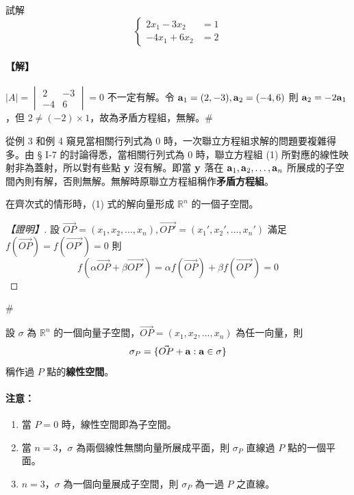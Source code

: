 \begin{example}\label{ex:b6-1-44}
試解
\[ \left\{\begin{aligned}
2x_1 - 3x_2 &= 1 \\
-4x_1 + 6x_2 &= 2
\end{aligned}\right. \]
\end{example}

\paragraph{【解】}
$|A| = \begin{vmatrix} 2 & -3 \\ -4 & 6 \end{vmatrix} = 0$ 不一定有解。令 $\boldsymbol{\mathbf{a}}_1=(2, -3), \boldsymbol{\mathbf{a}}_2=(-4, 6)$ 則 $\boldsymbol{\mathbf{a}}_2 = -2\boldsymbol{\mathbf{a}}_1$，但 $2 \ne (-2) \times 1$，故為矛盾方程組，無解。\hfill$\#$

從例 3 和例 4 窺見當相關行列式為 0 時，一次聯立方程組求解的問題要複雜得多。由 § I-7 的討論得悉，當相關行列式為 0 時，聯立方程組 (1) 所對應的線性映射非為蓋射，所以對有些點 $\boldsymbol{\mathbf{y}}$ 沒有解。即當 $\boldsymbol{\mathbf{y}}$ 落在 $\boldsymbol{\mathbf{a}}_1, \boldsymbol{\mathbf{a}}_2, \dots, \boldsymbol{\mathbf{a}}_n$ 所展成的子空間內則有解，否則無解。無解時原聯立方程組稱作\textbf{矛盾方程組}。

\begin{discussion}[*]\label{disc:b6-1-6}
在齊次式的情形時，(1) 式的解向量形成 $\mathbb{R}^n$ 的一個子空間。
\end{discussion}

\begin{proof}[【證明】]
設 $\vec{OP}=(x_1, x_2, \dots, x_n), \vec{OP'}=(x_1', x_2', \dots, x_n')$ 滿足 $f(\vec{OP}) = f(\vec{OP'}) = 0$ 則
\[ f(\alpha\vec{OP} + \beta\vec{OP'}) = \alpha f(\vec{OP}) + \beta f(\vec{OP'}) = 0 \]
\end{proof}\hfill$\#$

\begin{definition*}[**]\label{def:b6-1-affine}
設 $\sigma$ 為 $\mathbb{R}^n$ 的一個向量子空間，$\vec{OP}=(x_1, x_2, \dots, x_n)$ 為任一向量，則
\begin{equation}
\sigma_P = \{ \vec{OP} + \boldsymbol{\mathbf{a}} : \boldsymbol{\mathbf{a}} \in \sigma \} \label{eq:b6-1-8-4}
\end{equation}
稱作過 $P$ 點的\textbf{線性空間}。
\end{definition*}

\paragraph{注意：}
\begin{enumerate}[label=\arabic*., leftmargin=2em]
  \item 當 $P=0$ 時，線性空間即為子空間。
  \item 當 $n=3$，$\sigma$ 為兩個線性無關向量所展成平面，則 $\sigma_P$ 直線過 $P$ 點的一個平面。
  \item $n=3$，$\sigma$ 為一個向量展成子空間，則 $\sigma_P$ 為一過 $P$ 之直線。
\end{enumerate}

